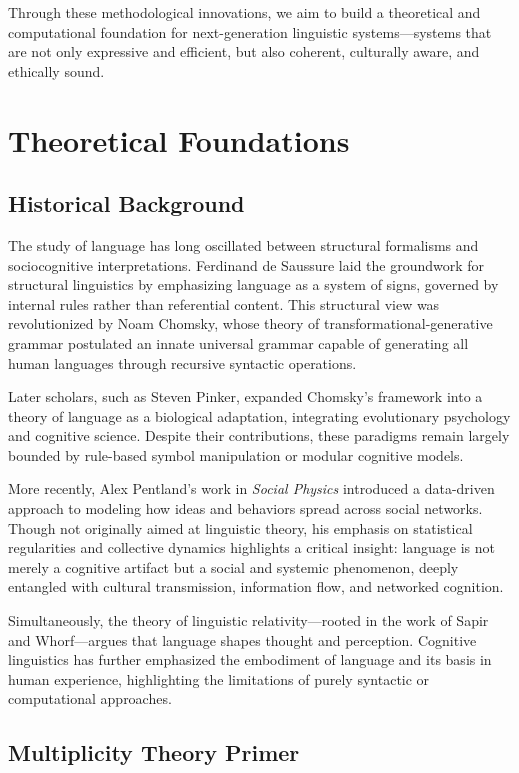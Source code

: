 \documentclass{article}
\theoremstyle{plain}
\theoremstyle{claimstyle}
\begin{document}
Through these methodological innovations, we aim to build a theoretical and computational foundation for next-generation linguistic systems—systems that are not only expressive and efficient, but also coherent, culturally aware, and ethically sound.

\section{Theoretical Foundations}

\subsection{Historical Background}

The study of language has long oscillated between structural formalisms and sociocognitive interpretations. Ferdinand de Saussure laid the groundwork for structural linguistics by emphasizing language as a system of signs, governed by internal rules rather than referential content. This structural view was revolutionized by Noam Chomsky, whose theory of transformational-generative grammar postulated an innate universal grammar capable of generating all human languages through recursive syntactic operations.

Later scholars, such as Steven Pinker, expanded Chomsky's framework into a theory of language as a biological adaptation, integrating evolutionary psychology and cognitive science. Despite their contributions, these paradigms remain largely bounded by rule-based symbol manipulation or modular cognitive models.

More recently, Alex Pentland’s work in \textit{Social Physics} introduced a data-driven approach to modeling how ideas and behaviors spread across social networks. Though not originally aimed at linguistic theory, his emphasis on statistical regularities and collective dynamics highlights a critical insight: language is not merely a cognitive artifact but a social and systemic phenomenon, deeply entangled with cultural transmission, information flow, and networked cognition.

Simultaneously, the theory of linguistic relativity—rooted in the work of Sapir and Whorf—argues that language shapes thought and perception. Cognitive linguistics has further emphasized the embodiment of language and its basis in human experience, highlighting the limitations of purely syntactic or computational approaches.

\subsection{Multiplicity Theory Primer}
\end{document}
